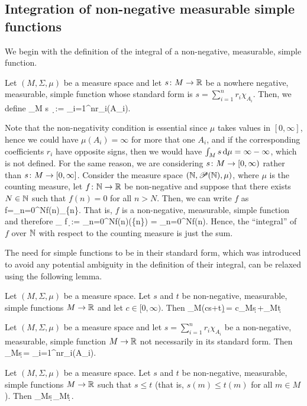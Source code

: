 \subsection{Integration of non-negative measurable simple functions}

We begin with the definition of the integral of a non-negative, measurable, simple function.

\bd
Let $(M,\Sigma,\mu)$ be a measure space and let $s\colon M \to \mathbb{R}$ be a nowhere negative, measurable, simple function whose standard form is $s=\sum_{i=1}^n r_i \chi_{A_i}$. Then, we define
\bse
\int_M \! s \, \d \mu := \sum_{i=1}^nr_i\mu(A_i).
\ese
\ed

Note that the non-negativity condition is essential since $\mu$ takes values in $[0,\infty]$, hence we could have $\mu(A_i)=\infty$ for more that one $A_i$, and if the corresponding coefficients $r_i$ have opposite signs, then we would have $\int_Ms\,\mathrm{d}\mu=\infty-\infty$, which is not defined. For the same reason, we are considering $s\colon M\to [0,\infty)$ rather than $s\colon M\to [0,\infty]$.
\be
Consider the measure space $(\mathbb{N},\mathscr{P}(\mathbb{N}),\mu)$, where $\mu$ is the counting measure, let $f\colon \mathbb{N} \to \mathbb{R}$ be non-negative and suppose that there exists $N\in\mathbb{N}$ such that $f(n)=0$ for all $n>N$. Then, we can write $f$ as
\bse
f=\sum_{n=0}^Nf(n)\chi_{\{n\}}.
\ese
That is, $f$ is a non-negative, measurable, simple function and therefore
\bse
\int_{\N}\! f \,\d \mu := \sum_{n=0}^Nf(n)\mu(\{n\}) = \sum_{n=0}^Nf(n).
\ese
Hence, the ``integral'' of $f$ over $\mathbb{N}$ with respect to the counting measure is just the sum.
\ee

The need for simple functions to be in their standard form, which was introduced to avoid any potential ambiguity in the definition of their integral, can be relaxed using the following lemma.

\bl
\label{lem:simplelinear}
Let $(M,\Sigma,\mu)$ be a measure space. Let $s$ and $t$ be non-negative, measurable, simple functions $M\to \mathbb{R}$ and let $c\in [0,\infty)$. Then
\bse
\int_M\!(cs+t)\,\d\mu = c\int_M\!s\,\d\mu+\int_M\!t\,\d\mu
\ese
\el

\bp
Let $(M,\Sigma,\mu)$ be a measure space and let $s=\sum_{i=1}^n r_i \chi_{A_i}$ be a non-negative, measurable, simple function $M\to \mathbb{R}$ not necessarily in its standard form. Then
\bse
\int_M\!s\,\d\mu = \sum_{i=1}^nr_i\mu(A_i).
\ese
\ep

\bc
Let $(M,\Sigma,\mu)$ be a measure space. Let $s$ and $t$ be non-negative, measurable, simple functions $M\to \mathbb{R}$ such that $s\leq t$ (that is, $s(m)\leq t(m)$ for all $m\in M$). Then
\bse
\int_M\!s\,\d\mu \leq \int_M\!t\,\d\mu. 
\ese
\ec

